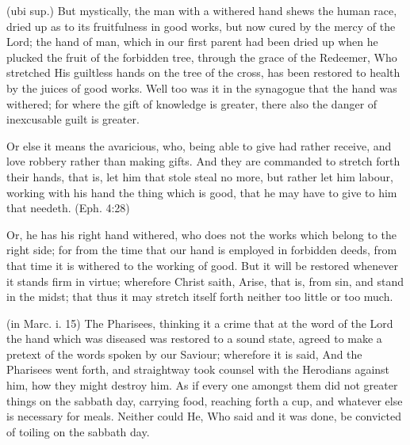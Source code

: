  (ubi sup.) But mystically, the man with a withered hand shews the human race, dried up as to its fruitfulness in good works, but now cured by the mercy of the Lord; the hand of man, which in our first parent had been dried up when he plucked the fruit of the forbidden tree, through the grace of the Redeemer, Who stretched His guiltless hands on the tree of the cross, has been restored to health by the juices of good works. Well too was it in the synagogue that the hand was withered; for where the gift of knowledge is greater, there also the danger of inexcusable guilt is greater.

 Or else it means the avaricious, who, being able to give had rather receive, and love robbery rather than making gifts. And they are commanded to stretch forth their hands, that is, let him that stole steal no more, but rather let him labour, working with his hand the thing which is good, that he may have to give to him that needeth. (Eph. 4:28)

 Or, he has his right hand withered, who does not the works which belong to the right side; for from the time that our hand is employed in forbidden deeds, from that time it is withered to the working of good. But it will be restored whenever it stands firm in virtue; wherefore Christ saith, Arise, that is, from sin, and stand in the midst; that thus it may stretch itself forth neither too little or too much.

 

 (in Marc. i. 15) The Pharisees, thinking it a crime that at the word of the Lord the hand which was diseased was restored to a sound state, agreed to make a pretext of the words spoken by our Saviour; wherefore it is said, And the Pharisees went forth, and straightway took counsel with the Herodians against him, how they might destroy him. As if every one amongst them did not greater things on the sabbath day, carrying food, reaching forth a cup, and whatever else is necessary for meals. Neither could He, Who said and it was done, be convicted of toiling on the sabbath day.

